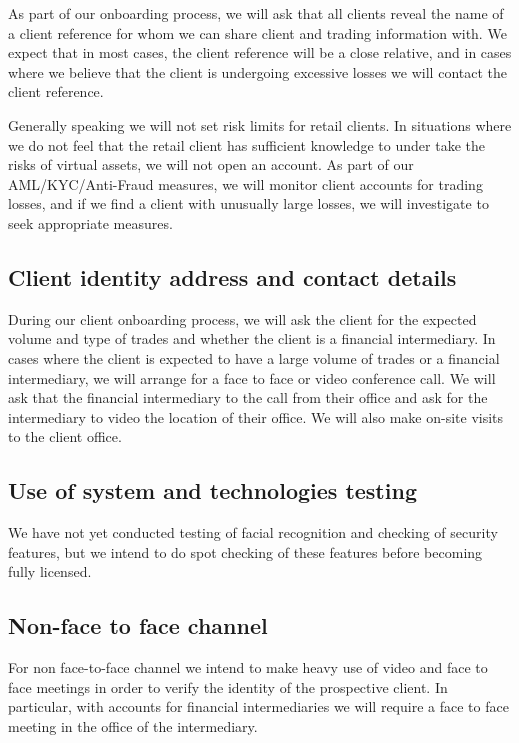 As part of our onboarding process, we will ask that all clients reveal
the name of a client reference for whom we can share client and
trading information with.  We expect that in most cases, the client
reference will be a close relative, and in cases where we believe that
the client is undergoing excessive losses we will contact the client
reference.

Generally speaking we will not set risk limits for retail clients.  In
situations where we do not feel that the retail client has sufficient
knowledge to under take the risks of virtual assets, we will not open
an account.  As part of our AML/KYC/Anti-Fraud measures, we will
monitor client accounts for trading losses, and if we find a client
with unusually large losses, we will investigate to seek appropriate
measures.

\subsection{Client identity address and contact details}
During our client onboarding process, we will ask the client for the
expected volume and type of trades and whether the client is a
financial intermediary.  In cases where the client is expected to have
a large volume of trades or a financial intermediary, we will arrange
for a face to face or video conference call.  We will ask that the
financial intermediary to the call from their office and ask for the
intermediary to video the location of their office.  We will also make
on-site visits to the client office.

\subsection{Use of system and technologies testing}
We have not yet conducted testing of facial recognition and checking
of security features, but we intend to do spot checking of these
features before becoming fully licensed.

\subsection{Non-face to face channel}
For non face-to-face channel we intend to make heavy use of video and
face to face meetings in order to verify the identity of the
prospective client.  In particular, with accounts for financial
intermediaries we will require a face to face meeting in the office of
the intermediary.

